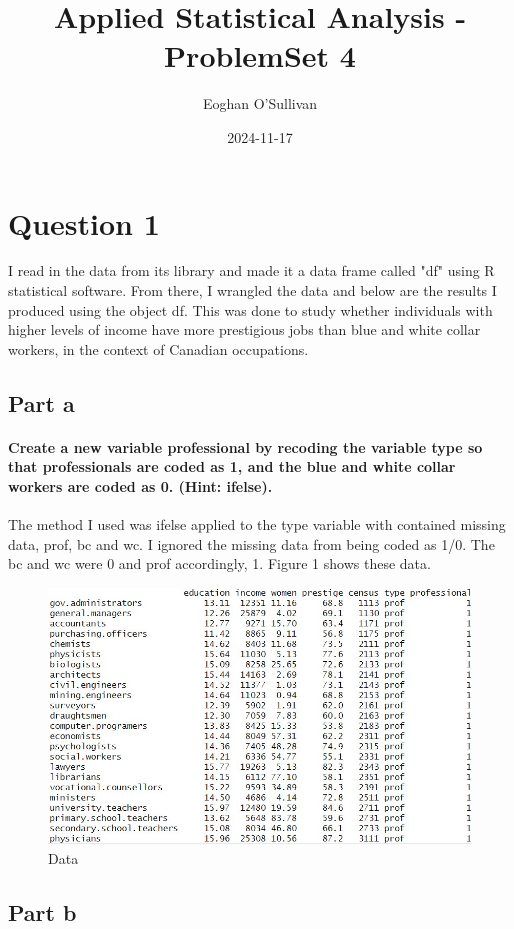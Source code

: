 \documentclass{article}
\title{Applied Statistical Analysis - ProblemSet 4}
\date{2024-11-17}
\author{Eoghan O'Sullivan}
\begin{document}
	\maketitle
	
	\section{Question 1}
	I read in the data from its library and made it a data frame called "df" using R statistical software. From there, I wrangled the data and below are the results I produced using the object df. This was done to study whether individuals with higher levels of income have more prestigious jobs than blue and white collar workers, in the context of Canadian occupations.
	\subsection{Part a}
	\paragraph{Create a new variable professional by recoding the variable type so that professionals are coded as 1, and the blue and white collar workers are coded as 0. (Hint: ifelse).}
	The method I used was ifelse applied to the type variable with contained missing data, prof, bc and wc. I ignored the missing data from being coded as 1/0. The bc and wc were 0 and prof accordingly, 1. Figure 1 shows these data.
	\begin{figure}[H]
		\centering
		\includegraphics[width=0.9\linewidth]{Data frame printed.jpg}
		\caption{Data}
		\label{fig:Coded new variable called professional}
	\end{figure}
	\subsection{Part b}
\end{document}
